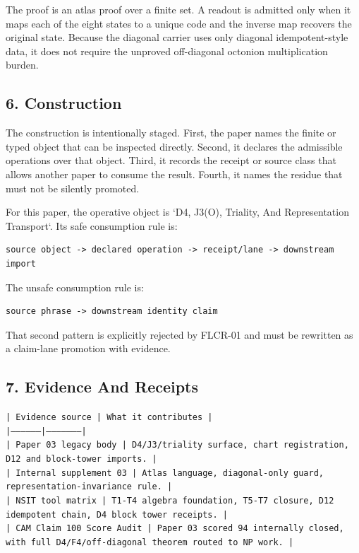 \documentclass[11pt]{article}
\begin{document}
The proof is an atlas proof over a finite set. A readout is admitted only when it maps each of the eight states to a unique code and the inverse map recovers the original state. Because the diagonal carrier uses only diagonal idempotent-style data, it does not require the unproved off-diagonal octonion multiplication burden.

\subsection*{6. Construction}

The construction is intentionally staged. First, the paper names the finite or
typed object that can be inspected directly. Second, it declares the admissible
operations over that object. Third, it records the receipt or source class that
allows another paper to consume the result. Fourth, it names the residue that
must not be silently promoted.

For this paper, the operative object is `D4, J3(O), Triality, And Representation Transport`. Its safe consumption
rule is:

\begin{verbatim}
source object -> declared operation -> receipt/lane -> downstream import
\end{verbatim}

The unsafe consumption rule is:

\begin{verbatim}
source phrase -> downstream identity claim
\end{verbatim}

That second pattern is explicitly rejected by FLCR-01 and must be rewritten as
a claim-lane promotion with evidence.

\subsection*{7. Evidence And Receipts}

\noindent\texttt{| Evidence source | What it contributes |}\\
\noindent\texttt{|-----------------|---------------------|}\\
\noindent\texttt{| Paper 03 legacy body | D4/J3/triality surface, chart registration, D12 and block-tower imports. |}\\
\noindent\texttt{| Internal supplement 03 | Atlas language, diagonal-only guard, representation-invariance rule. |}\\
\noindent\texttt{| NSIT tool matrix | T1-T4 algebra foundation, T5-T7 closure, D12 idempotent chain, D4 block tower receipts. |}\\
\noindent\texttt{| CAM Claim 100 Score Audit | Paper 03 scored 94 internally closed, with full D4/F4/off-diagonal theorem routed to NP work. |}\\
\end{document}
